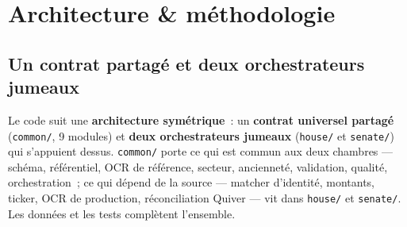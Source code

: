 \documentclass[11pt,a4paper]{article}
\newcommand{\co}[1]{\texttt{\small #1}}
\begin{document}
\section{Architecture \& méthodologie}
\label{sec:archi}

\subsection{Un contrat partagé et deux orchestrateurs jumeaux}
\label{sec:archi-couches}
Le code suit une \textbf{architecture symétrique}~: un \textbf{contrat universel partagé} (\co{common/},
9 modules) et \textbf{deux orchestrateurs jumeaux} (\co{house/} et \co{senate/}) qui s'appuient dessus.
\co{common/} porte ce qui est commun aux deux chambres — schéma, référentiel, OCR de référence, secteur,
ancienneté, validation, qualité, orchestration~; ce qui dépend de la source — matcher d'identité,
montants, ticker, OCR de production, réconciliation Quiver — vit dans \co{house/} et \co{senate/}. Les
données et les tests complètent l'ensemble.
\end{document}
